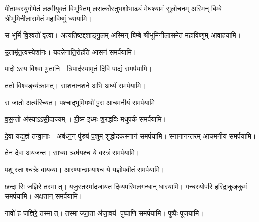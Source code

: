 \begin{center}


{पीताम्बरयुगोपेतं लक्ष्मीयुक्तं विभूषितम्}
{लसत्कौस्तुभशोभाढ्यं मेघश्यामं सुलोचनम्}
अस्मिन् बिम्बे श्रीभूमिनीलासमेतं महाविष्णुं ध्यायामि।
\medskip

{स भूमिं॑ वि॒श्वतो॑ वृ॒त्वा। अत्य॑तिष्ठद्दशाङ्गु॒लम्}
अस्मिन् बिम्बे श्रीभूमिनीलासमेतं महाविष्णुम् आवाहयामि।
\medskip

 {उ॒तामृ॑त॒त्वस्येशा॑नः। यदन्ने॑नाति॒रोह॑ति}
 आसनं समर्पयामि।\medskip

{पादोऽस्य॒ विश्वा॑ भू॒तानि॑। त्रि॒पाद॑स्या॒मृतं॑ दि॒वि}
 पाद्यं समर्पयामि।\medskip
 
{ततो॒ विश्व॒ङ्व्य॑क्रामत्। सा॒श॒ना॒न॒श॒ने अ॒भि}
 अर्घ्यं समर्पयामि।\medskip

{स जा॒तो अत्य॑रिच्यत। प॒श्चाद्भूमि॒मथो॑ पु॒रः}
 आचमनीयं समर्पयामि।\medskip

{व॒स॒न्तो अ॑स्याऽऽसी॒दाज्यम्। ग्री॒ष्म इ॒ध्मः श॒रद्ध॒विः}
मधुपर्कं समर्पयामि।\medskip

 {दे॒वा यद्य॒ज्ञं त॑न्वा॒नाः। अब॑ध्न॒न् पु॑रुषं प॒शुम्}
 शुद्धोदकस्नानं समर्पयामि। स्नानानन्तरम् आचमनीयं समर्पयामि।\medskip

 {तेन॑ दे॒वा अय॑जन्त। सा॒ध्या ऋष॑यश्च॒ ये}
 वस्त्रं समर्पयामि।\medskip

{प॒शूस्ताश्च॑क्रे वाय॒व्या\sn{}। आ॒र॒ण्यान्ग्रा॒म्याश्च॒ ये}
 यज्ञोपवीतं समर्पयामि।\medskip

{छन्दासि जज्ञिरे॒ तस्मात्। यजु॒स्तस्मा॑दजायत}
 दिव्यपरिमलगन्धान् धारयामि। गन्धस्योपरि हरिद्राकुङ्कुमं समर्पयामि। अक्षतान् समर्पयामि।\medskip

{गावो॑ ह जज्ञिरे॒ तस्मात्। तस्माज्जा॒ता अ॑जा॒वय॑}
 पुष्पाणि समर्पयामि।  पुष्पैः पूजयामि।


\end{center}
